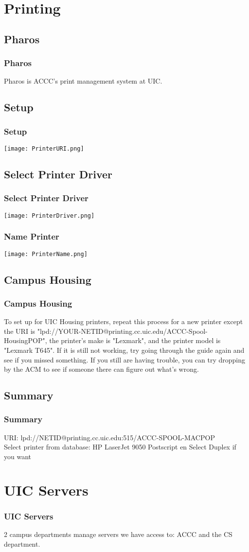 \documentclass[hyperref={pdfpagelabels=false}]{beamer}
\begin{document}
\section{Printing}
\subsection{Pharos}
\frame
{
    \frametitle{Pharos}
    Pharos is ACCC's print management system at UIC.
}
\subsection{Setup}
\frame
{
    \frametitle{Setup}
     \texttt{[image: PrinterURI.png]}
}
\subsection{Select Printer Driver}
\frame
{
    \frametitle{Select Printer Driver}
     \texttt{[image: PrinterDriver.png]}
}
\frame
{
    \frametitle{Name Printer}
     \texttt{[image: PrinterName.png]}

}
\subsection{Campus Housing}
\frame
{
	\frametitle{Campus Housing}
	To set up for UIC Housing printers, repeat this process for a new printer except the URI is "lpd://YOUR-NETID@printing.cc.uic.edu/ACCC-Spool-HousingPOP", the printer's make is "Lexmark", and the printer model is "Lexmark T645". If it is still not working, try going through the guide again and see if you missed something. If you still are having trouble, you can try dropping by the ACM to see if someone there can figure out what's wrong. 
}
\subsection{Summary}
\frame
{
    \frametitle{Summary}
URI: lpd://NETID@printing.cc.uic.edu:515/ACCC-SPOOL-MACPOP\\
Select printer from database: HP LaserJet 9050 Postscript en
Select Duplex if you want


}
\section{UIC Servers}
\frame
{
    \frametitle{UIC Servers}
    2 campus departments manage servers we have access to: ACCC and the CS department.
}
\end{document}
